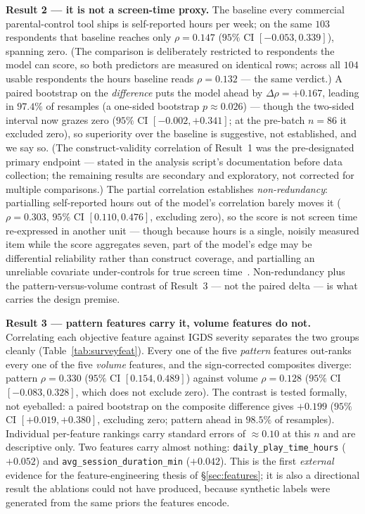 \documentclass[11pt,a4paper]{article}
\begin{document}
\textbf{Result 2 --- it is not a screen-time proxy.} The
baseline every commercial parental-control tool ships is self-reported hours per
week; on the same $103$ respondents that baseline reaches only $\rho = 0.147$
($95\%$ CI $[-0.053, 0.339]$), spanning zero. (The comparison is deliberately
restricted to respondents the model can score, so both predictors are measured
on identical rows; across all $104$ usable respondents the hours baseline reads
$\rho = 0.132$ --- the same verdict.) A paired bootstrap on the
\emph{difference} puts the model ahead by $\Delta\rho = +0.167$, leading in
$97.4\%$ of resamples (a one-sided bootstrap $p \approx 0.026$) --- though the
two-sided interval now grazes zero ($95\%$ CI $[-0.002, +0.341]$; at the
pre-batch $n{=}86$ it excluded zero), so superiority over the baseline is
suggestive, not established, and we say so. (The construct-validity correlation
of Result~1 was the pre-designated primary endpoint --- stated in the analysis
script's documentation before data collection; the remaining results are
secondary and exploratory, not corrected for multiple comparisons.) The partial correlation establishes \emph{non-redundancy}:
partialling self-reported hours out of the model's correlation barely moves it
($\rho = 0.303$, $95\%$ CI $[0.110, 0.476]$, excluding zero), so the score is
not screen time re-expressed in another unit --- though because hours is a
single, noisily measured item while the score aggregates seven, part of the
model's edge may be differential reliability rather than construct coverage,
and partialling an unreliable covariate under-controls for true screen
time~\cite{westfall2016}. Non-redundancy plus the pattern-versus-volume
contrast of Result~3 --- not the paired delta --- is what carries the design
premise.

\textbf{Result 3 --- pattern features carry it, volume features do not.}
Correlating each objective feature against IGDS severity separates the two
groups cleanly (Table~\ref{tab:surveyfeat}). Every one of the five
\emph{pattern} features out-ranks every one of the five \emph{volume} features,
and the sign-corrected composites diverge: pattern $\rho = 0.330$ ($95\%$ CI
$[0.154, 0.489]$) against volume $\rho = 0.128$ ($95\%$ CI $[-0.083, 0.328]$,
which does not exclude zero). The contrast is tested formally, not eyeballed: a
paired bootstrap on the composite difference gives $+0.199$ ($95\%$ CI
$[+0.019, +0.380]$, excluding zero; pattern ahead in $98.5\%$ of resamples).
Individual per-feature rankings carry standard errors of ${\approx}0.10$ at
this $n$ and are descriptive only. Two features carry almost nothing:
\texttt{daily\_play\_time\_hours} ($+0.052$) and
\texttt{avg\_session\_duration\_min} ($+0.042$). This is the first
\emph{external} evidence for the feature-engineering thesis of \S\ref{sec:features};
it is also a directional result the ablations could not have produced, because
synthetic labels were generated from the same priors the features encode.
\end{document}
